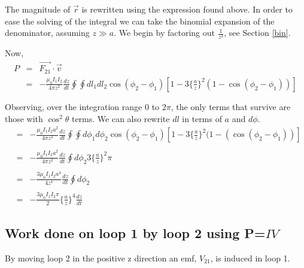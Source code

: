 \documentclass[12pt]{revtex4}
\begin{document}
The magnitude of $\vec{r}$ is rewritten using the expression found above.  In order to ease the solving of the integral we can take the binomial expansion of the denominator, assuming $z\gg a$.  We begin by factoring out $\frac{1}{z^3}$, see Section \ref{bin}.



Now,
\begin{eqnarray*}
P &=&\vec{F_{21}} \cdot \vec{v}\\ 
&=&- \frac{\mu_{0} I_{1}I_{2}}{4\pi z^{2}} \frac{dz}{dt} \oint  \oint dl_{1} dl_{2} \cos(\phi_{2}-\phi_{1})  \left[1-3\big\{ \frac{a}{z}\big\}^{2}\left(1-\cos(\phi_{2}-\phi_{1})\right) \right] \\ \\
\end{eqnarray*}
Observing, over the integration range $0$ to $2\pi$,  the only terms that survive are those with $\cos^2{\theta}$ terms.  We can also rewrite $dl$ in terms of $a$ and $d\phi$.
\begin{eqnarray*}
&=&- \frac{\mu_{0} I_{1}I_{2}a^{2}}{4\pi z^{2}} \frac{dz}{dt} \oint  \oint d\phi_{1} d\phi_{2} \cos(\phi_{2}-\phi_{1})  [1-3\big\{ \frac{a}{z}\big\}^{2}(1-(\cos(\phi_{2}-\phi_{1}))] \\ \\
&=&- \frac{\mu_{0} I_{1}I_{2}a^{2}}{4\pi z^{2}} \frac{dz}{dt} \oint d\phi_{2}3\big\{ \frac{a}{z}\big\}^{2}\pi \\ \\
&=&- \frac{3\mu_{0} I_{1}I_{2}a^{4}}{4 z^{4}} \frac{dz}{dt} \oint d\phi_{2}\\ \\ 
&=&- \frac{3\mu_{0} I_{1}I_{2}\pi}{2} \Big\{\frac{a}{z}\Big\}^{4}\frac{dz}{dt}
\end{eqnarray*}


\subsection{Work done on loop 1 by loop 2 using P=$IV$}

By moving loop 2 in the positive z direction an emf, $V_{21}$, is induced in loop 1. 
\end{document}

